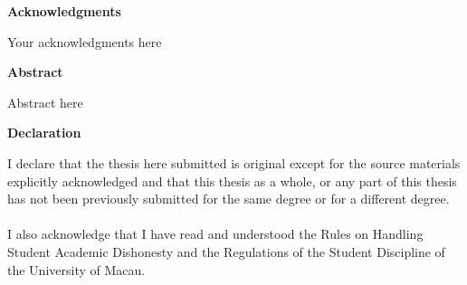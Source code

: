 

\begin{center}
	{\bf \large Acknowledgments}
\end{center}

Your acknowledgments here 



\newpage\thispagestyle{plain}


\begin{center}
	{\bf Abstract}
\end{center}

Abstract here



\newpage\thispagestyle{plain}


\begin{center}
	{\bf \large Declaration}
\end{center}

\setlength{\parindent}{0pt}
I declare that the thesis here submitted is original except for the source materials explicitly acknowledged
and that this thesis as a whole, or any part of this thesis has not been previously submitted
for the same degree or for a different degree. \\
\\
\setlength{\parindent}{0pt} I also acknowledge that I have read and understood the Rules on Handling
Student Academic Dishonesty and the Regulations of the Student Discipline of the University of Macau.
